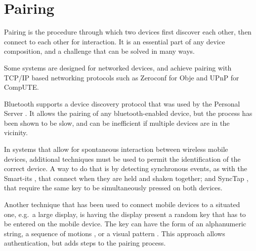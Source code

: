 %

\section{Pairing}
\label{sec:rwpairing}

Pairing is the procedure through which two devices first discover each other, then connect to each other for interaction.
It is an essential part of any device composition, and a challenge that can be solved in many ways.

Some systems are designed for networked devices, and achieve pairing with TCP/IP based networking protocols such as Zeroconf \citep{zeroconf} for Obje and UPnP \citep{upnp} for CompUTE.

Bluetooth \citep{bluetooth} supports a device discovery protocol that was used by the Personal Server \citep{Want:2002:personalserver}.
It allows the pairing of any bluetooth-enabled device, but the process has been shown to be slow, and can be inefficient if multiple devices are in the vicinity.

In systems that allow for spontaneous interaction between wireless mobile devices, additional techniques must be used to permit the identification of the correct device.
A way to do that is by detecting synchronous events, as with the Smart-its \citep{Holmquist:2001:smartits}, that connect when they are held and shaken together; and SyncTap \citep{Rekimoto:2003:synctap}, that require the same key to be simultaneously pressed on both devices.

Another technique that has been used to connect mobile devices to a situated one, e.g.\ a large display, is having the display present a random key that has to be entered on the mobile device.
The key can have the form of an alphanumeric string, a sequence of motions \citep{Patel:2004:mobileauth}, or a visual pattern \citep{Ballagas:2005:sweeppointshoot, Scott:2005:visualauth}.
This approach allows authentication, but adds steps to the pairing process.

